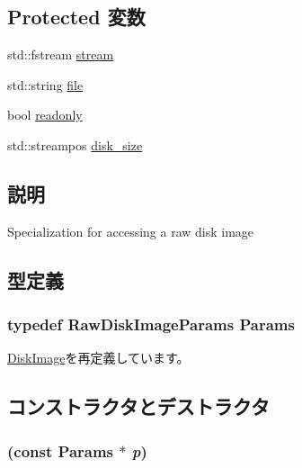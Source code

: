 \subsection*{Protected 変数}
\begin{DoxyCompactItemize}
\item 
std::fstream \hyperlink{classRawDiskImage_a8858ebba853bebec63897a055877c296}{stream}
\item 
std::string \hyperlink{classRawDiskImage_aefc35c7944eed319c89bc1b399f0eb67}{file}
\item 
bool \hyperlink{classRawDiskImage_ae04692b1a934bc6b8c48b43c95add0fa}{readonly}
\item 
std::streampos \hyperlink{classRawDiskImage_a242120545024c17e9854e58aa7496c08}{disk\_\-size}
\end{DoxyCompactItemize}


\subsection{説明}
Specialization for accessing a raw disk image 

\subsection{型定義}
\hypertarget{classRawDiskImage_af714565806621f1401c71701d4c88e71}{
\subsubsection[{Params}]{\setlength{\rightskip}{0pt plus 5cm}typedef RawDiskImageParams {\bf Params}}}
\label{classRawDiskImage_af714565806621f1401c71701d4c88e71}


\hyperlink{classDiskImage_a7fcdce57df9801d7eebcb65f9ad2e0c0}{DiskImage}を再定義しています。

\subsection{コンストラクタとデストラクタ}
\hypertarget{classRawDiskImage_a945e6d30a2216c70e181eb80cf249d52}{
\subsubsection[{RawDiskImage}]{ (const {\bf Params} $\ast$ {\em p})}}
\label{classRawDiskImage_a945e6d30a2216c70e181eb80cf249d52}



